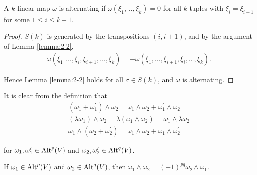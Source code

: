\begin{lemma}\label{lemma:2-7}
  A $k$-linear map $\omega$ is alternating if $\omega(\xi_1, \ldots, \xi_k) = 0$ for all $k$-tuples
  with $\xi_i = \xi_{i+1}$ for some $1\le i\le k-1$.
\end{lemma}


\begin{proof}
  $S(k)$ is generated by the transpositions $(i, i + 1)$, and by the argument
  of Lemma \ref{lemma:2-2},
  \begin{align*}
    \omega(\xi_1, \ldots, \xi_i, \xi_{i+1}, \ldots, \xi_k)
    = - \omega(\xi_1, \ldots, \xi_{i+1}, \xi_i, \ldots, \xi_k).
  \end{align*}

  Hence Lemma \ref{lemma:2-2} holds for all $\sigma\in S(k)$, and $\omega$ is alternating.
\end{proof}

It is clear from the definition that
\begin{align*}
  (\omega_{1}+\omega_{1}^{\prime})\wedge\omega_{2}
  = \omega_{1}\wedge\omega_{2}+\omega_{1}^{\prime}\wedge\omega_{2}            \\
  (\lambda\omega_{1})\wedge\omega_{2}
  = \lambda(\omega_{1}\wedge\omega_{2})=\omega_{1}\wedge\lambda\omega_{2} \\
  \omega_{1}\wedge\left(\omega_{2}+\omega_{2}^{\prime}\right)
  = \omega_{1}\wedge\omega_{2}+\omega_{1}\wedge\omega_{2}^{\prime}
\end{align*}

for $\omega_1, \omega_1' \in\operatorname{Alt}^p(V)$ and $\omega_2, \omega_2'\in\operatorname{Alt}^q(V)$.


\begin{lemma}\label{lemma:2-8}
  If $\omega_1\in\operatorname{Alt}^p(V)$ and $\omega_2\in\operatorname{Alt}^q(V)$, then $\omega_1\wedge\omega_2 = (-1)^{pq}\omega_2\wedge\omega_1$.
\end{lemma}


